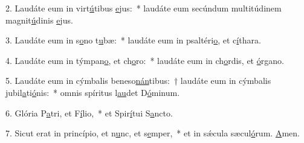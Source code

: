 2. Laudáte eum in virt\uline{ú}tibus \uline{e}jus:~* laudáte eum secúndum multitúdinem magnit\uline{ú}dinis \uline{e}jus.\par 
3. Laudáte eum in s\uline{o}no t\uline{u}bæ:~* laudáte eum in psaltéri\uline{o}, et c\uline{í}thara.\par 
4. Laudáte eum in týmpan\uline{o}, et ch\uline{o}ro:~* laudáte eum in ch\uline{o}rdis, et \uline{ó}rgano.\par 
5. Laudáte eum in cýmbalis beneso\uline{nán}tibus:~† laudáte eum in cýmbalis jubil\uline{a}ti\uline{ó}nis:~* omnis spíritus l\uline{au}det D\uline{ó}minum.\par 
6. Glória P\uline{a}tri, et F\uline{í}lio,~* et Spir\uline{í}tui S\uline{a}ncto.\par 
7. Sicut erat in princípio, et n\uline{u}nc, et s\uline{e}mper,~* et in sǽcula sæcul\uline{ó}rum. \uline{A}men.\par 
